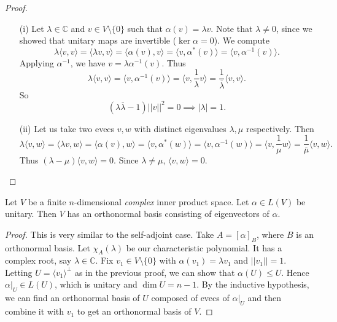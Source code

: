 \documentclass[egregdoesnotlikesansseriftitles,a4paper]{scrartcl}
\begin{document}
\begin{proof}
      \begin{itemize}
           \item[(i)] Let $\lambda \in \mathbb{C}$ and $v \in V \setminus \{0\}$ such that $\alpha (v)=\lambda v$. Note that $\lambda \neq 0$, since we showed that unitary maps are invertible ($\operatorname{ker}\alpha =0$). We compute 
           \[\lambda \langle v,v \rangle =\langle \lambda v, v \rangle =\langle \alpha (v), v \rangle =\langle v,\alpha^* (v) \rangle =\langle v,{\alpha}^{-1} (v) \rangle .\]
           Applying ${\alpha}^{-1}$, we have $v=\lambda{\alpha}^{-1}(v)$. Thus 
           \[\lambda \langle v,v \rangle =\langle v, {\alpha }^{-1}(v) \rangle=\langle v,\frac{1}{\lambda}v \rangle =\frac{1}{\overline{\lambda} }\langle v,v \rangle .\]
           So 
           \begin{equation*}
                 (\lambda \overline{\lambda}-1 ) ||v||^2=0 \implies |\lambda|=1.
           \end{equation*}
          \item[(ii)]Let us take two evecs $v,w$ with distinct eigenvalues $\lambda, \mu $ respectively. Then 
          \[\lambda \langle v,w \rangle =\langle \lambda v, w \rangle =\langle \alpha (v), w \rangle =\langle v, \alpha^* (w) \rangle =\langle v, {\alpha}^{-1} (w) \rangle =\langle v,\frac{1}{\mu}w \rangle=\frac{1}{\overline{\mu} } \langle v,w \rangle .\]
          Thus $(\lambda-\mu) \langle v,w \rangle =0$. Since $\lambda \neq \mu$, $\langle v,w \rangle =0$.
           
      \end{itemize}
\end{proof}

\begin{theorem}
      Let $V$ be a finite $n$-dimensional \emph{complex} inner product space. Let $\alpha \in L (V)$ be unitary. Then $V$ has an orthonormal basis consisting of eigenvectors of $\alpha $.
\end{theorem}
\begin{proof}
      This is very similar to the self-adjoint case. Take $A=[\alpha]_B$, where $B$ is an orthonormal basis. Let $\chi_A (\lambda)$ be our characteristic polynomial. It has a complex root, say $\lambda \in \mathbb{C}$. Fix $v_1 \in V \setminus \{0\}$ with $\alpha (v_1)= \lambda v_1$ and $||v_1||=1$. Letting $U=\langle v_1 \rangle ^\perp $ as in the previous proof, we can show that $\alpha (U) \leq U$. Hence $\alpha|_U \in L (U)$, which is unitary and $\operatorname{dim} U=n-1$. By the inductive hypothesis, we can find an orthonormal basis of $U$ composed of evecs of $\alpha|_U $ and then combine it with $v_1$ to get an orthonormal basis of $V$.
\end{proof}
\end{document}
